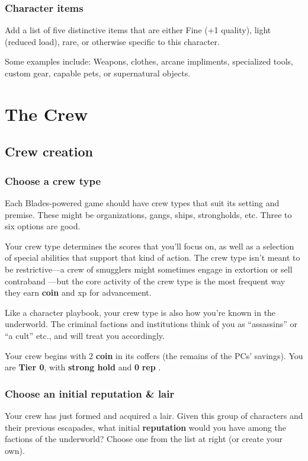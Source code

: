 \documentclass[11pt,fleqn,a5paper]{book}
\newcommand{\gameterm}[1]{\textbf{#1}}
\begin{document}
\section{Character items}

Add a list of five distinctive items that are either Fine (+1 quality), light (reduced load), rare, or otherwise specific to this character.

Some examples include: Weapons, clothes, arcane impliments, specialized tools, custom gear, capable pets, or supernatural objects.

\part{The Crew}

\chapter{Crew creation}

\section{Choose a crew type}

Each Blades-powered game should have crew types that suit its setting and premise. These might be organizations, gangs, ships, strongholds, etc. Three to six options are good.

Your crew type determines the scores that you’ll focus on, as well as a selection of special abilities that support that kind of action. The crew type isn’t meant to be restrictive---a crew of smugglers might sometimes engage in extortion  or sell contraband ---but the core activity of the crew type is the most frequent way they earn \gameterm{coin}  and xp for advancement.

Like a character playbook, your crew type is also how you’re known in the underworld. The criminal factions and institutions think of you as “assassins” or “a cult” etc., and will treat you accordingly.

Your crew begins with 2 \gameterm{coin}  in its coffers (the remains of the PCs’ savings). You are \textbf{Tier 0}, with \textbf{strong hold} and \textbf{0} \gameterm{rep} .

\section{Choose an initial reputation \& lair}

Your crew has just formed and acquired a lair. Given this group of characters and their previous escapades, what initial \textbf{reputation} would you have among the factions of the underworld? Choose one from the list at right (or create your own).
\end{document}
